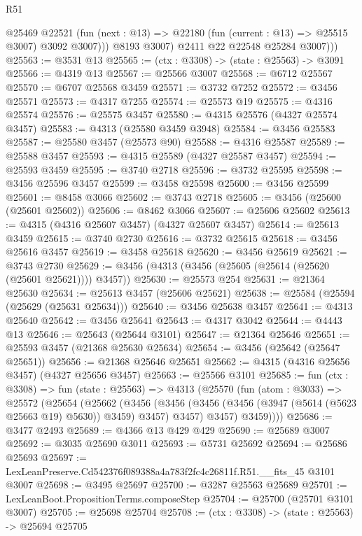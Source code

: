 \begin{lexlean}{R51}
\begin{coremodule}
                @25469
                @22521
                (fun (next : @13) => @22180 (fun (current : @13) => @25515 @3007) @3092 @3007)))
            @8193
            @3007)
          @2411
          @22
          @22548
          @25284
          @3007)))
@25563 := @3531 @13
@25565 := (ctx : @3308) -> (state : @25563) -> @3091
@25566 := @4319 @13
@25567 := @25566 @3007
@25568 := @6712 @25567
@25570 := @6707 @25568 @3459
@25571 := @3732 @7252
@25572 := @3456 @25571
@25573 := @4317 @7255
@25574 := @25573 @19
@25575 := @4316 @25574
@25576 := @25575 @3457
@25580 := @4315 @25576 (@4327 @25574 @3457)
@25583 := @4313 (@25580 @3459 @3948)
@25584 := @3456 @25583
@25587 := @25580 @3457 (@25573 @90)
@25588 := @4316 @25587
@25589 := @25588 @3457
@25593 := @4315 @25589 (@4327 @25587 @3457)
@25594 := @25593 @3459
@25595 := @3740 @2718
@25596 := @3732 @25595
@25598 := @3456 @25596 @3457
@25599 := @3458 @25598
@25600 := @3456 @25599
@25601 := @8458 @3066
@25602 := @3743 @2718
@25605 := @3456 (@25600 (@25601 @25602))
@25606 := @8462 @3066
@25607 := @25606 @25602
@25613 := @4315 (@4316 @25607 @3457) (@4327 @25607 @3457)
@25614 := @25613 @3459
@25615 := @3740 @2730
@25616 := @3732 @25615
@25618 := @3456 @25616 @3457
@25619 := @3458 @25618
@25620 := @3456 @25619
@25621 := @3743 @2730
@25629 := @3456 (@4313 (@3456 (@25605 (@25614 (@25620 (@25601 @25621)))) @3457))
@25630 := @25573 @254
@25631 := @21364 @25630
@25634 := @25613 @3457 (@25606 @25621)
@25638 := @25584 (@25594 (@25629 (@25631 @25634)))
@25640 := @3456 @25638 @3457
@25641 := @4313 @25640
@25642 := @3456 @25641
@25643 := @4317 @3042
@25644 := @4443 @13
@25646 := @25643 (@25644 @3101)
@25647 := @21364 @25646
@25651 := @25593 @3457 (@21368 @25630 @25634)
@25654 := @3456 (@25642 (@25647 @25651))
@25656 := @21368 @25646 @25651
@25662 := @4315 (@4316 @25656 @3457) (@4327 @25656 @3457)
@25663 := @25566 @3101
@25685 := fun (ctx : @3308) =>
  fun (state : @25563) =>
  @4313
    (@25570
      (fun (atom : @3033) =>
      @25572
        (@25654
          (@25662
            (@3456
              (@3456 (@3456 (@3456 (@3947 (@5614 (@5623 @25663 @19) @5630)) @3459) @3457) @3457)
              @3457)
            @3459))))
@25686 := @3477 @2493
@25689 := @4366 @13 @429 @429
@25690 := @25689 @3007
@25692 := @3035 @25690 @3011
@25693 := @5731 @25692
@25694 := @25686 @25693
@25697 := LexLeanPreserve.Cd542376f089388a4a783f2fc4c26811f.R51.__fits_45 @3101 @3007
@25698 := @3495 @25697
@25700 := @3287 @25563 @25689
@25701 := LexLeanBoot.PropositionTerms.composeStep
@25704 := @25700 (@25701 @3101 @3007)
@25705 := @25698 @25704
@25708 := (ctx : @3308) -> (state : @25563) -> @25694 @25705

\end{coremodule}
\end{lexlean}
